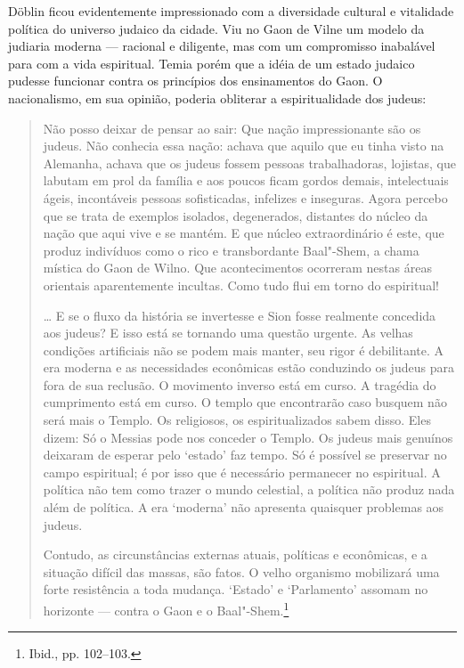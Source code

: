 \asterisc

Döblin ficou evidentemente impressionado com a diversidade cultural e
vitalidade política do universo judaico da cidade. Viu no Gaon de Vilne
um modelo da judiaria moderna --- racional e diligente, mas com um
compromisso inabalável para com a vida espiritual. Temia porém que a
idéia de um estado judaico pudesse funcionar contra os princípios dos
ensinamentos do Gaon. O nacionalismo, em sua opinião, poderia obliterar
a espiritualidade dos judeus:

\begin{quote}
Não posso deixar de pensar ao sair: Que nação impressionante são os
judeus. Não conhecia essa nação: achava que aquilo que eu tinha visto na
Alemanha, achava que os judeus fossem pessoas trabalhadoras, lojistas,
que labutam em prol da família e aos poucos ficam gordos demais,
intelectuais ágeis, incontáveis pessoas sofisticadas, infelizes e
inseguras. Agora percebo que se trata de exemplos isolados, degenerados,
distantes do núcleo da nação que aqui vive e se mantém. E que núcleo
extraordinário é este, que produz indivíduos como o rico e transbordante
Baal"-Shem, a chama mística do Gaon de Wilno. Que acontecimentos
ocorreram nestas áreas orientais aparentemente incultas. Como tudo flui
em torno do espiritual!

\ldots{} E se o fluxo da história se invertesse e Sion fosse realmente
concedida aos judeus? E isso está se tornando uma questão urgente. As
velhas condições artificiais não se podem mais manter, seu rigor é
debilitante. A era moderna e as necessidades econômicas estão conduzindo
os judeus para fora de sua reclusão. O movimento inverso está em curso.
A tragédia do cumprimento está em curso. O templo que encontrarão caso
busquem não será mais o Templo. Os religiosos, os espiritualizados sabem
disso. Eles dizem: Só o Messias pode nos conceder o Templo. Os judeus
mais genuínos deixaram de esperar pelo `estado' faz tempo. Só é possível
se preservar no campo espiritual; é por isso que é necessário permanecer
no espiritual. A política não tem como trazer o mundo celestial, a
política não produz nada além de política. A era `moderna' não apresenta
quaisquer problemas aos judeus.

Contudo, as circunstâncias externas atuais, políticas e econômicas, e a
situação difícil das massas, são fatos. O velho organismo mobilizará uma
forte resistência a toda mudança. `Estado' e `Parlamento' assomam no
horizonte --- contra o Gaon e o Baal"-Shem.\footnote{Ibid., pp. 102--103.}
\end{quote}

